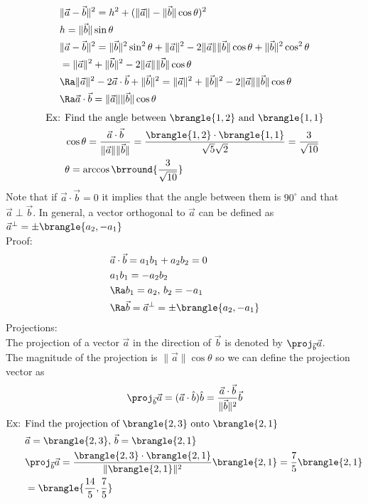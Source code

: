 \begin{align*}
    &\|\vec{a}-\vec{b}\|^2=h^2+(\|\vec{a}\|-\|\vec{b}\|\cos\theta)^2\\
    &h=\|\vec{b}\|\sin\theta\\
    &\|\vec{a}-\vec{b}\|^2=\|\vec{b}\|^2\sin^2\theta+\|\vec{a}\|^2-2\|\vec{a}\|\|\vec{b}\|\cos\theta+\|\vec{b}\|^2\cos^2\theta\\
    &=\|\vec{a}\|^2+\|\vec{b}\|^2-2\|\vec{a}\|\|\vec{b}\|\cos\theta\\
    &\Ra\|\vec{a}\|^2-2\vec{a}\cdot\vec{b}+\|\vec{b}\|^2=\|\vec{a}\|^2+\|\vec{b}\|^2-2\|\vec{a}\|\|\vec{b}\|\cos\theta\\
    &\Ra\vec{a}\cdot\vec{b}=\|\vec{a}\|\|\vec{b}\|\cos\theta
\end{align*}
\begin{align*}
    \text{Ex: }&\text{Find the angle between $\brangle{1,2}$ and $\brangle{1,1}$}\\
    &\cos\theta=\frac{\vec{a}\cdot\vec{b}}{\|\vec{a}\|\|\vec{b}\|}=\frac{\brangle{1,2}\cdot\brangle{1,1}}{\sqrt{5}\sqrt{2}}=\frac{3}{\sqrt{10}}\\
    &\theta=\arccos\brround{\frac{3}{\sqrt{10}}}
\end{align*}
Note that if $\vec{a}\cdot\vec{b}=0$ it implies that the angle between them is $90^\circ$ and that $\vec{a}\perp\vec{b}$. In general, a vector orthogonal to $\vec{a}$ can be defined as $\vec{a}^\perp=\pm\brangle{a_2,-a_1}$\\
Proof:
\begin{align*}
    &\vec{a}\cdot\vec{b}=a_1b_1+a_2b_2=0\\
    &a_1b_1=-a_2b_2\\
    &\Ra b_1=a_2,\,b_2=-a_1\\
    &\Ra\vec{b}=\vec{a}^\perp=\pm\brangle{a_2,-a_1}
\end{align*}
Projections:\\
The projection of a vector $\vec{a}$ in the direction of $\vec{b}$ is denoted by $\proj_{\vec{b}}\vec{a}$.\\
The magnitude of the projection is $\|\vec{a}\|\cos\theta$ so we can define the projection vector as
$$\proj_{\vec{b}}\vec{a}=(\vec{a}\cdot\hat{b})\hat{b}=\frac{\vec{a}\cdot\vec{b}}{\|\vec{b}\|^2}\vec{b}$$
\begin{align*}
    \text{Ex: }&\text{Find the projection of $\brangle{2,3}$ onto $\brangle{2,1}$}\\
    &\vec{a}=\brangle{2,3},\,\vec{b}=\brangle{2,1}\\
    &\proj_{\vec{b}}\vec{a}=\frac{\brangle{2,3}\cdot\brangle{2,1}}{\|\brangle{2,1}\|^2}\brangle{2,1}=\frac{7}{5}\brangle{2,1}\\
    &=\brangle{\frac{14}{5},\frac{7}{5}}
\end{align*}
